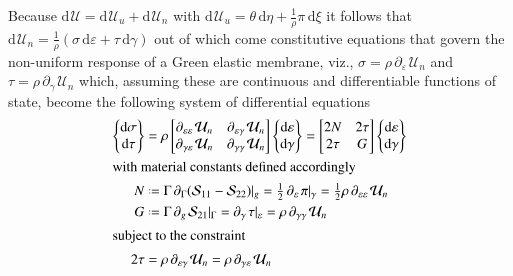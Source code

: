 Because $\mathrm{d} \hspace{1pt}\mathcal{U} = \mathrm{d}\hspace{1pt} \mathcal{U}_u + \mathrm{d}\hspace{1pt} \mathcal{U}_n$ with $\mathrm{d}\hspace{1pt} \mathcal{U}_u = \theta \, \mathrm{d} \eta + \tfrac{1}{\rho} \pi \, \mathrm{d} \xi$ it follows that $\mathrm{d}\hspace{1pt} \mathcal{U}_n = \tfrac{1}{\rho} ( \sigma \, \mathrm{d} \varepsilon + \tau \, \mathrm{d} \gamma )$ out of which come constitutive equations that govern the non-uniform response of a Green elastic membrane, viz., $\sigma = \rho \, \partial_{\varepsilon\,} \mathcal{U}_n$ and $\tau = \rho \, \partial_{\gamma\,} \mathcal{U}_n$ which, assuming these are continuous and differentiable functions of state, become the following system of differential equations
\begin{subequations}
    \begin{align}
    \left\{ \begin{matrix}  
    \mathrm{d} \sigma \\ \mathrm{d} \tau
    \end{matrix} \right\} & = \rho \begin{bmatrix}
    \partial_{\varepsilon\varepsilon\,} \mathcal{U}_n & 
    \partial_{\varepsilon\gamma\,} \mathcal{U}_n \\
    \partial_{\gamma\varepsilon\,} \mathcal{U}_n &
    \partial_{\gamma\gamma\,} \mathcal{U}_n
    \end{bmatrix} \left\{ \begin{matrix}
    \mathrm{d} \varepsilon \\ \mathrm{d} \gamma
    \end{matrix} \right\} = \begin{bmatrix}
    2 N & 2 \tau \\ 
    2 \tau & G
    \end{bmatrix} \left\{ \begin{matrix}
    \mathrm{d} \varepsilon \\ \mathrm{d} \gamma
    \end{matrix} \right\} \\
    \intertext{with material constants defined accordingly}
    N & \defeq \Gamma \, \partial_{\Gamma} ( \mathcal{S}_{11} - \mathcal{S}_{22} ) |_g = \tfrac{1}{2} \, \partial_{\varepsilon\,} \pi |_{\gamma} = \tfrac{1}{2} \rho \, \partial_{\varepsilon\varepsilon\,} \mathcal{U}_n \\
    G & \defeq \Gamma \, \partial_{g\,} \mathcal{S}_{21} |_{\Gamma} = \partial_{\gamma\,} \tau |_{\varepsilon} = \rho \, \partial_{\gamma\gamma\,} \mathcal{U}_n \\
    \intertext{subject to the constraint}
    2\tau & = \rho \, \partial_{\varepsilon\gamma\,} \mathcal{U}_n = \rho \, \partial_{\gamma\varepsilon\,} \mathcal{U}_n
    \label{thermoConstraint}
    \end{align}
\end{subequations}
